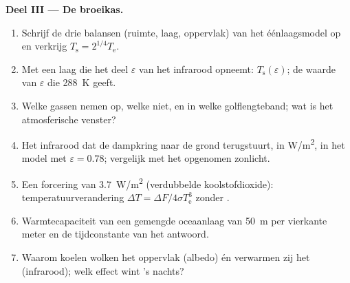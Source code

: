 \begin{problem}
\textbf{Deel III --- De broeikas.}
\begin{enumerate}[resume]
  \item Schrijf de drie balansen (ruimte, laag, oppervlak) van het
        éénlaagsmodel op en verkrijg $T_{\text{s}} = 2^{1/4}T_{\text{e}}$.
  \item Met een laag die het deel $\varepsilon$ van het infrarood opneemt:
        $T_{\text{s}}(\varepsilon)$; de waarde van $\varepsilon$
        die \qty{288}{K} geeft.
  \item Welke gassen nemen op, welke niet, en in welke golflengteband;
        wat is het atmosferische venster?
  \item Het infrarood dat de dampkring naar de grond terugstuurt,
        in \unit{W/m^2}, in het model met $\varepsilon = 0.78$; vergelijk met
        het opgenomen zonlicht.
  \item Een forcering van \qty{3.7}{W/m^2} (verdubbelde koolstofdioxide):
        temperatuurverandering $\Delta T = \Delta F/4\sigma T_{\text{e}}^3$
        zonder .
  \item Warmtecapaciteit van een gemengde oceaanlaag van \qty{50}{m} per vierkante
        meter en de tijdconstante van het antwoord.
  \item Waarom koelen wolken het oppervlak (albedo) én verwarmen zij het
        (infrarood); welk effect wint 's nachts?
\end{enumerate}


\end{problem}
